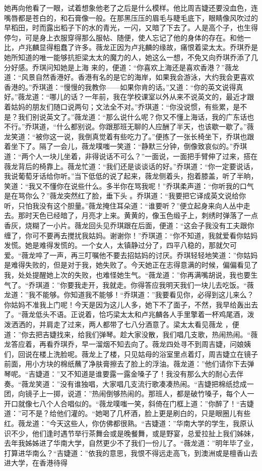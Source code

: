 \documentclass{article}
\begin{document}
她再向他看了一眼，试着想象他老了之后是什么模样。他比周吉婕还要没血色，连嘴唇都是苍白的，和石膏像一般。在那黑压压的眉毛与睫毛底下，眼睛像风吹过的早稻田，时而露出稻子下的水的青光，一闪，又暗了下去了。人是高个子，也生得停匀，可是身上衣服穿得那么服帖、随便，使人忘记了他的身体的存在。和他一比，卢兆麟显得粗蠢了许多。薇龙正因为卢兆麟的缘故，痛恨着梁太太。乔琪乔是她所知道的唯一能够抗拒梁太太的魔力的人，她这么一想，不免又向乔琪乔添了几分好感。乔琪问知她是上海
\newpage
来的，便道：“你喜欢上海还是喜欢香港？”薇龙道：“风景自然香港好。香港有名的是它的海岸，如果我会游泳，大约我会更喜欢香港的。”乔琪道：“慢慢的我教你——如果你肯的话。”又道：“你的英文说得真好。”薇龙道：“哪儿的话？一年前，我在学校课室以外从来不说英文的，最近才跟着姑妈的朋友们随口说两句；文法全不对。”乔琪道：“你没说惯，有些累，是不是？我们别说英文了。”薇龙道：“那么说什么呢？你又不懂上海话，我的广东话也不行。”乔琪道，“什么都别说。你跟那班无聊的人应酬了半天，也该歇一歇了。”薇龙笑道：“被你这一说，我倒真觉着有些吃力了。”便拣了一张长椅坐下，乔琪也跟着坐下了。隔了一会儿，薇龙噗嗤一笑道：“静默三分钟，倒像致哀似的。”乔琪道：“两个人一块儿坐着，非得说话不可么？”一面说，一面把手臂伸了过来，搭在薇龙背后的椅靠上。薇龙忙道：“我们还是谈谈话的好。”乔琪道：“你一定要说话，我说葡萄牙话给你听。”当下低低的说了起来，薇龙侧着头，抱着膝盖，听了半晌，笑道：“我又不懂你在说些什么。多半你在骂我呢！”乔琪柔声道：“你听我的口气是在骂你么？”薇龙突然红了脸，垂下头
\newpage
。乔琪道：“我要把它译成英文说给你听，只怕我没有这个胆量。”薇龙掩住耳朵道：“谁要听？”便立起身来向人丛中走去。那时天色已经暗了，月亮才上来。黄黄的，像玉色缎子上，刺绣时弹落了一点香灰，烧糊了一小片。薇龙回头见乔琪跟在后面，便道：“这会子我没有工夫跟你缠了，你可不要再去搅扰我姑妈。谢谢你！”乔琪道：“你不知道，我就爱看你姑妈发慌。她是难得发慌的。一个女人，太镇静过分了，四平八稳的，那就欠可爱。“薇龙啐了一声，再三叮嘱他不要去招姑妈的讨厌。乔琪轻轻地笑道：”你姑妈是难得失败的，但是对于我，她失败了。今天她正在志得意满的时候，偏偏看见了我，处处提醒她上次的失败，也难怪她生气。“薇龙道：”你再满嘴胡说，我也要生气了。“乔琪道：”你要我走开，我就走。你得答应我明天我们一块儿去吃饭。“薇龙道：”我不能够。你知道我不能够！“乔琪道：”我要看见你，必得到这儿来么？你姑妈不准我上门呢！今天是因为这儿人多，她下不了面子，不然，我早给轰出去了。“薇龙低头不语。正说着，恰巧梁太太和卢兆麟各人手里擎着一杯鸡尾酒，泼泼洒洒的，并肩走了过来，两人都带了七八分酒意了。梁太太看见薇龙
\newpage
，便道：”你去把吉婕找来，给我们弹琴。趁大家没散，我们唱几支歌，热闹热闹。“薇龙答应着，再看乔琪乔，早一溜烟不知去向了。薇龙四处寻不到周吉婕，问娘姨们，回说在楼上洗脸呢。薇龙上了楼，只见姑母的浴室里点着灯，周吉婕立在镜子前面，用小方块的棉纸蘸了净肤膏擦去了脸上的浮油。薇龙道：”他们请你下去弹琴呢。“吉婕道：”又不知道是谁要露一露金嗓子了！我没有那么大的耐心去伴奏。“薇龙笑道：”没有谁独唱，大家唱几支流行歌凑凑热闹。“吉婕把棉纸捻成一团，向镜子上一掷，说道：”热闹倒够热闹的。那班人，都是破竹嗓子，每个人一开口就像七八个人合唱似的。“薇龙噗嗤一笑，斜倚在门框上道：”你醉了！“吉婕道：”可不是？给他们灌的。“她喝了几杯酒，脸上更是刷白的，只是眼圈儿有些红。薇龙道：”今天这些人，你仿佛都很熟。“吉婕道：”华南大学的学生，我原认识不少，他们逢时遇节举行茶舞会或是晚餐舞，或是野宴，总爱拉扯上我们姊妹，去年我姊姊进了华南大学，自然更少不了我们一份儿了。“薇龙道：”明年毕了业，打算进华南么？“吉婕道：”依我的意思，我恨不得远走高飞，到澳洲或是檀香山去进大学，在香港待得
\end{document}
